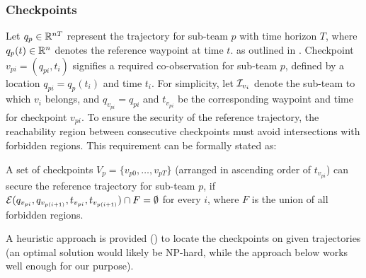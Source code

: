 \documentclass[10pt,twocolumn,twoside]{IEEEtran}
\begin{document}
\subsubsection{Checkpoints}\label{sec:security-checkpoint}
Let $q_p\in\mathbb{R}^{nT}{}$ represent the trajectory for sub-team $p$ with time horizon $T$, where $q_{p}(t) \in \mathbb{R}^{n}{}$ denotes the reference waypoint at time $t$.  as outlined in . Checkpoint $v_{pi}=(q_{pi},t_{i})$ signifies a required co-observation for sub-team $p$, defined by a location $q_{pi}=q_{p}(t_i)$ and time $t_{i}$. For simplicity, let $\mathcal{I}_{v_{i}}$ denote the sub-team to which $v_{i}$ belongs, and $q_{v_{pi}} =q_{pi}$ and $t_{v_{pi}}$ be the corresponding waypoint and time for checkpoint $v_{pi}$. To ensure the security of the reference trajectory, the reachability region between consecutive checkpoints must avoid intersections with forbidden regions. This requirement can be formally stated as:


\begin{remark}
A set of checkpoints $V_{p}=\{ v_{p0}, \dots ,v_{pT}\}$ (arranged in ascending order of $t_{v_{pi}}$) can secure the reference trajectory for sub-team $p$, if $\mathcal{E}(q_{v_{pi}}, q_{v_{p(i+1)}}, t_{v_{pi}},t_{v_{p(i+1)}}) \cap F = \emptyset$ for every $i$, where $F$ is the union of all forbidden regions.
\end{remark}

A heuristic approach is provided () to locate the checkpoints on given trajectories (an optimal solution would likely be NP-hard, while the approach below works well enough for our purpose). %
\end{document}
